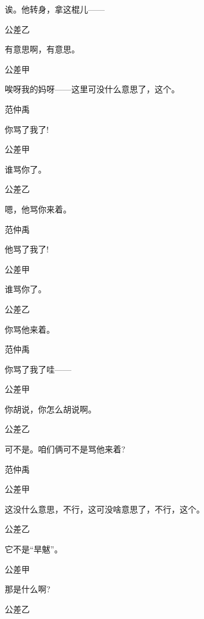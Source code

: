 诶。他转身，拿这棍儿------

公差乙\hspace{20pt}~

有意思啊，有意思。

公差甲\hspace{20pt}~

唉呀我的妈呀------这里可没什么意思了，这个。

范仲禹\hspace{20pt}~

你骂了我了!

公差甲\hspace{20pt}~

谁骂你了。

公差乙\hspace{20pt}~

嗯，他骂你来着。

范仲禹\hspace{20pt}~

他骂了我了!

公差甲\hspace{20pt}~

谁骂你了。

公差乙\hspace{20pt}~

你骂他来着。

范仲禹\hspace{20pt}~

你骂了我了哇------

公差甲\hspace{20pt}~

你胡说，你怎么胡说啊。

公差乙\hspace{20pt}~

可不是。咱们俩可不是骂他来着?

范仲禹\hspace{20pt}~


公差甲\hspace{20pt}~

这没什么意思，不行，这可没啥意思了，不行，这个。

公差乙\hspace{20pt}~

它不是``旱魃''。

公差甲\hspace{20pt}~

那是什么啊?

公差乙\hspace{20pt}~

